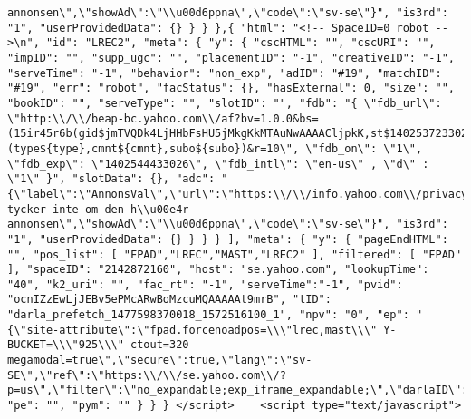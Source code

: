 \begin{verbatim}
annonsen\",\"showAd\":\"\\u00d6ppna\",\"code\":\"sv-se\"}", "is3rd": "1", "userProvidedData": {} } } },{ "html": "<!-- SpaceID=0 robot -->\n", "id": "LREC2", "meta": { "y": { "cscHTML": "", "cscURI": "", "impID": "", "supp_ugc": "", "placementID": "-1", "creativeID": "-1", "serveTime": "-1", "behavior": "non_exp", "adID": "#19", "matchID": "#19", "err": "robot", "facStatus": {}, "hasExternal": 0, "size": "", "bookID": "", "serveType": "", "slotID": "", "fdb": "{ \"fdb_url\": \"http:\\/\\/beap-bc.yahoo.com\\/af?bv=1.0.0&bs=(15ir45r6b(gid$jmTVQDk4LjHHbFsHU5jMkgKkMTAuNwAAAACljpkK,st$1402537233026922,srv$1,si$13303551,adv$25941429036,ct$25,li$3239250051,exp$1402544433026922,cr$4154984551,pbid$25372728133,v$1.0))&al=(type${type},cmnt${cmnt},subo${subo})&r=10\", \"fdb_on\": \"1\", \"fdb_exp\": \"1402544433026\", \"fdb_intl\": \"en-us\" , \"d\" : \"1\" }", "slotData": {}, "adc": "{\"label\":\"AnnonsVal\",\"url\":\"https:\\/\\/info.yahoo.com\\/privacy\\/se\\/yahoo\\/relevantads.html\",\"close\":\"St\\u00e4ng\",\"closeAd\":\"St\\u00e4ng\",\"collapse\":\"Komprimera\",\"fdb\":\"Jag tycker inte om den h\\u00e4r annonsen\",\"showAd\":\"\\u00d6ppna\",\"code\":\"sv-se\"}", "is3rd": "1", "userProvidedData": {} } } } ], "meta": { "y": { "pageEndHTML": "", "pos_list": [ "FPAD","LREC","MAST","LREC2" ], "filtered": [ "FPAD" ], "spaceID": "2142872160", "host": "se.yahoo.com", "lookupTime": "40", "k2_uri": "", "fac_rt": "-1", "serveTime":"-1", "pvid": "ocnIZzEwLjJEBv5ePMcARwBoMzcuMQAAAAAt9mrB", "tID": "darla_prefetch_1477598370018_1572516100_1", "npv": "0", "ep": "{\"site-attribute\":\"fpad.forcenoadpos=\\\"lrec,mast\\\" Y-BUCKET=\\\"925\\\" ctout=320 megamodal=true\",\"secure\":true,\"lang\":\"sv-SE\",\"ref\":\"https:\\/\\/se.yahoo.com\\/?p=us\",\"filter\":\"no_expandable;exp_iframe_expandable;\",\"darlaID\":\"darla_instance_1477598370018_1560227598_0\"}", "pe": "", "pym": "" } } } </script>    <script type="text/javascript">

\end{verbatim}
